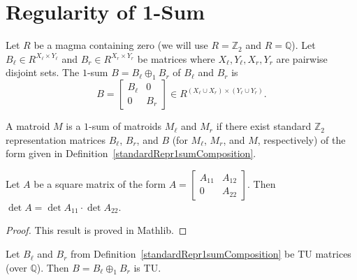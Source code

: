\chapter{Regularity of 1-Sum}

\begin{definition}
    \label{standardRepr1sumComposition}
    \leanok
    Let $R$ be a magma containing zero (we will use $R = \mathbb{Z}_{2}$ and $R = \mathbb{Q}$). Let $B_{\ell} \in R^{X_{\ell} \times Y_{\ell}}$ and $B_{r} \in R^{X_{r} \times Y_{r}}$ be matrices where $X_{\ell}, Y_{\ell}, X_{r}, Y_{r}$ are pairwise disjoint sets. The $1$-sum $B = B_{\ell} \oplus_{1} B_{r}$ of $B_{\ell}$ and $B_{r}$ is
    \[
        B = \begin{bmatrix} B_{\ell} & 0 \\ 0 & B_{r} \end{bmatrix} \in R^{(X_{\ell} \cup X_{r}) \times (Y_{\ell} \cup Y_{r})}.
    \]
\end{definition}

\begin{definition}
    \label{Matroid.Is1sumOf}
    \leanok
    A matroid $M$ is a $1$-sum of matroids $M_{\ell}$ and $M_{r}$ if there exist standard $\mathbb{Z}_{2}$ representation matrices $B_{\ell}$, $B_{r}$, and $B$ (for $M_{\ell}$, $M_{r}$, and $M$, respectively) of the form given in Definition~\ref{standardRepr1sumComposition}.
\end{definition}

\begin{lemma}
    \label{Matrix.det_fromBlocks_zero}
    \leanok
    Let $A$ be a square matrix of the form $A = \begin{bmatrix} A_{11} & A_{12} \\ 0 & A_{22} \end{bmatrix}$. Then $\det A = \det A_{11} \cdot \det A_{22}$.
\end{lemma}

\begin{proof}
    \leanok
    This result is proved in Mathlib.
\end{proof}

\begin{lemma}
    \label{Matrix.fromBlocks_isTotallyUnimodular}
    \leanok
    Let $B_{\ell}$ and $B_{r}$ from Definition~\ref{standardRepr1sumComposition} be TU matrices (over $\mathbb{Q}$). Then $B = B_{\ell} \oplus_{1} B_{r}$ is TU.
\end{lemma}

